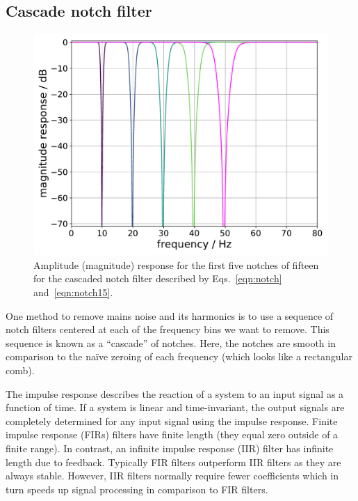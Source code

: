 \documentclass[aps,pra,superscriptaddress,reprint]{revtex4-2}
\begin{document}
\subsection{Cascade notch filter}

\label{sec:notch}
\begin{figure}
\begin{center}
\includegraphics[width=.5\textwidth]{figures/cascaded_notch_response_plot.pdf}
\end{center}
\caption{\label{fig:notchMagResponse}
Amplitude (magnitude) response for the first five notches of fifteen for the cascaded notch filter described by Eqs.~\ref{eqn:notch} and~\ref{eqn:notch15}. 
}
\end{figure}

One method to remove mains noise and its harmonics is to use a sequence of notch filters centered at each of the frequency bins we want to remove. This sequence is known as a ``cascade'' of notches. Here, the notches are smooth in comparison to the na{\"i}ve zeroing of each frequency (which looks like a rectangular comb). 

The impulse response describes the reaction of a system to an input signal as a function of time. 
If a system is linear and time-invariant, the output signals are completely determined for any input signal using the impulse response. 
Finite impulse response (FIRs) filters have finite length (they equal zero outside of a finite range). 
In contrast, an infinite impulse response (IIR) filter has infinite length due to feedback. 
Typically FIR filters outperform IIR filters as they are always stable. 
However, IIR filters normally require fewer coefficients which in turn speeds up signal processing in comparison to FIR filters. 
\end{document}
